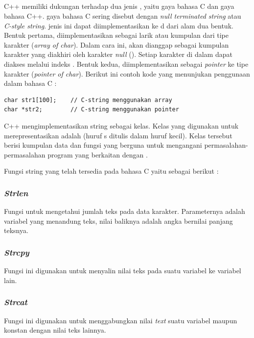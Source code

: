 \documentclass{subfiles}
\begin{document}
    \subsection{{\sString}}

    C++ memiliki dukungan terhadap dua jenis {\sstring}, yaitu {\sstring} gaya bahasa C dan gaya bahasa C++. {\sString} gaya bahasa C sering disebut dengan \textit{null terminated string} atau \textit{C-style string}. {\sString} jenis ini dapat diimplementasikan ke d dari alam dua bentuk. Bentuk pertama, {\sstring} diimplementasikan sebagai larik atau kumpulan dari tipe karakter (\textit{array of char}). Dalam cara ini, {\sstring} akan dianggap sebagai kumpulan karakter yang diakhiri oleh karakter \textit{null} (). Setiap karakter di dalam {\sstring} dapat diakses melalui indeks {\sarray}. Bentuk kedua, {\sstring} diimplementasikan sebagai \textit{pointer} ke tipe karakter (\textit{pointer  of char}). Berikut ini contoh kode yang menunjukan penggunaan {\sstring} dalam bahasa C \parencite{raharjo2015pemrograman}:

\begin{code}
\begin{verbatim}
char str1[100];    // C-string menggunakan array
char *str2;        // C-string menggunakan pointer
\end{verbatim}
\end{code}

    C++ mengimplementasikan string sebagai kelas. Kelas yang digunakan untuk merepresentasikan {\sstring} adalah  (huruf s ditulis dalam huruf kecil). Kelas tersebut berisi kumpulan data dan fungsi yang berguna untuk mengangani permasalahan-permasalahan program yang berkaitan dengan {\sstring} \parencite{raharjo2015pemrograman}.

    Fungsi string yang telah tersedia pada bahasa C yaitu sebagai berikut \parencite{sasongko2010modul}:
    \subsubsection{\textit{Strlen}}
    \begin{indentpar}\hpar{}
        Fungsi untuk mengetahui jumlah teks pada data karakter. Parameternya adalah variabel yang menandung teks, nilai baliknya adalah angka bernilai panjang teksnya.
    \end{indentpar}
    \subsubsection{\textit{Strcpy}}
    \begin{indentpar}
        Fungsi ini digunakan untuk menyalin nilai teks pada suatu variabel ke variabel lain.
    \end{indentpar}
    \subsubsection{\textit{Strcat}}
    \begin{indentpar}\hpar{}
        Fungsi ini digunakan untuk menggabungkan nilai \textit{text} suatu variabel maupun {\sstring} konstan dengan nilai teks lainnya.
    \end{indentpar}
\end{document}
